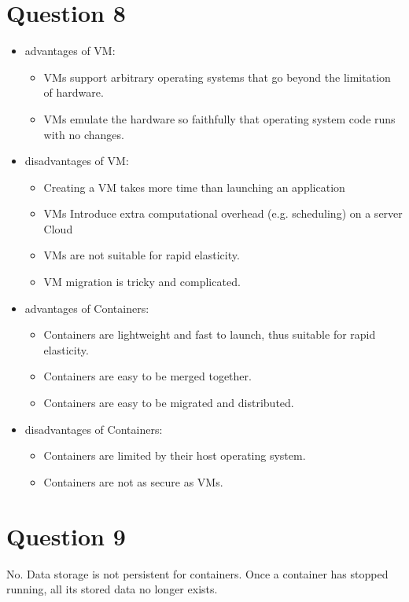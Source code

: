 \documentclass{article}
\begin{document}
\section{Question 8}
\begin{itemize}
    \item advantages of VM: 
        \begin{itemize}
        \item VMs support arbitrary operating systems that go beyond the limitation of hardware.
        \item VMs emulate the hardware so faithfully that operating system code runs with no changes.
        \end{itemize}
    \item disadvantages of VM:
        \begin{itemize}
        \item Creating a VM takes more time than launching an application
        \item VMs Introduce extra computational overhead (e.g. scheduling) on a server Cloud
        \item VMs are not suitable for rapid elasticity.
        \item VM migration is tricky and complicated.
        \end{itemize}
    \item advantages of Containers:
        \begin{itemize}
        \item Containers are lightweight and fast to launch, thus suitable for rapid elasticity.
        \item Containers are easy to be merged together.
        \item Containers are easy to be migrated and distributed.
        \end{itemize}
    \item disadvantages of Containers:
        \begin{itemize}
        \item Containers are limited by their host operating system.
        \item Containers are not as secure as VMs.
        \end{itemize}
\end{itemize}


\section{Question 9}
No. Data storage is not persistent for containers. Once a container has stopped running, all its stored data no longer exists.
\end{document}

